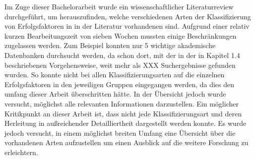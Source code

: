 Im Zuge dieser Bachelorarbeit wurde ein wissenschaftlicher Literaturreview durchgeführt, um herauszufinden, welche verschiedenen Arten der Klassifizierung von Erfolgsfaktoren in \ISPS in der Literatur vorhandenen sind. Aufgrund einer relativ kurzen Bearbeitungszeit von sieben Wochen mussten einige Beschränkungen zugelassen werden.
Zum Beispiel konnten nur 5 wichtige akademische Datenbanken durchsucht werden, da schon dort, mit der in der in Kapitel 1.4 beschriebenen Vorgehensweise, weit mehr als XXX Suchergebnisse gefunden wurden.
So konnte nicht bei allen Klassifizierungsarten auf die einzelnen Erfolgsfaktoren in den jeweiligen Gruppen eingegangen werden, da
dies den umfang dieser Arbeit überschritten hätte. In der Übersicht jedoch wurde versucht, möglichst alle relevanten Informationen darzustellen.
Ein möglicher Kritikpunkt an dieser Arbeit ist, dass nicht jede Klassifizierungsart und deren Herleitung in außreichender Detailliertheit dargestellt werden konnte. Es wurde jedoch versucht, in einem möglichst breiten Umfang eine Übersicht über die vorhandenen Arten aufzustellen um einen Ausblick auf die weitere Forschung zu erleichtern.
